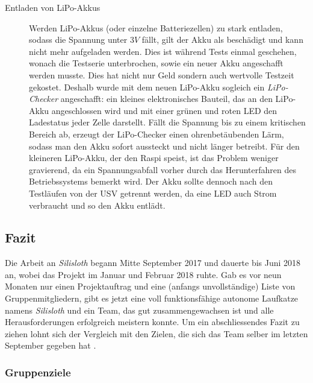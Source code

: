 \begin{description}
    \item[Entladen von LiPo-Akkus] Werden LiPo-Akkus (oder einzelne Batteriezellen) zu stark entladen, sodass die Spannung unter $3V$ fällt, gilt der Akku als beschädigt und kann nicht mehr aufgeladen werden. Dies ist während Tests einmal geschehen, wonach die Testserie unterbrochen, sowie ein neuer Akku angeschafft werden musste. Dies hat nicht nur Geld sondern auch wertvolle Testzeit gekostet. Deshalb wurde mit dem neuen LiPo-Akku sogleich ein \textit{LiPo-Checker} angeschafft: ein kleines elektronisches Bauteil, das an den LiPo-Akku angeschlossen wird und mit einer grünen und roten LED den Ladestatus jeder Zelle darstellt. Fällt die Spannung bis zu einem kritischen Bereich ab, erzeugt der LiPo-Checker einen ohrenbetäubenden Lärm, sodass man den Akku sofort aussteckt und nicht länger betreibt. Für den kleineren LiPo-Akku, der den Raspi speist, ist das Problem weniger gravierend, da ein Spannungsabfall vorher durch das Herunterfahren des Betriebssystems bemerkt wird. Der Akku sollte dennoch nach den Testläufen von der USV getrennt werden, da eine LED auch Strom verbraucht und so den Akku entlädt.
\end{description}

\subsection{Fazit}

Die Arbeit an \textit{Silisloth} begann Mitte September 2017 und dauerte bis Juni 2018 an, wobei das Projekt im Januar und Februar 2018 ruhte. Gab es vor neun Monaten nur einen Projektauftrag und eine (anfangs unvollständige) Liste von Gruppenmitgliedern, gibt es jetzt eine voll funktionsfähige autonome Laufkatze namens \textit{Silisloth} und ein Team, das gut zusammengewachsen ist und alle Herausforderungen erfolgreich meistern konnte.
Um ein abschliessendes Fazit zu ziehen lohnt sich der Vergleich mit den Zielen, die sich das Team selber im letzten September gegeben hat \cite[S. 49]{pren1}.

\subsubsection{Gruppenziele}

